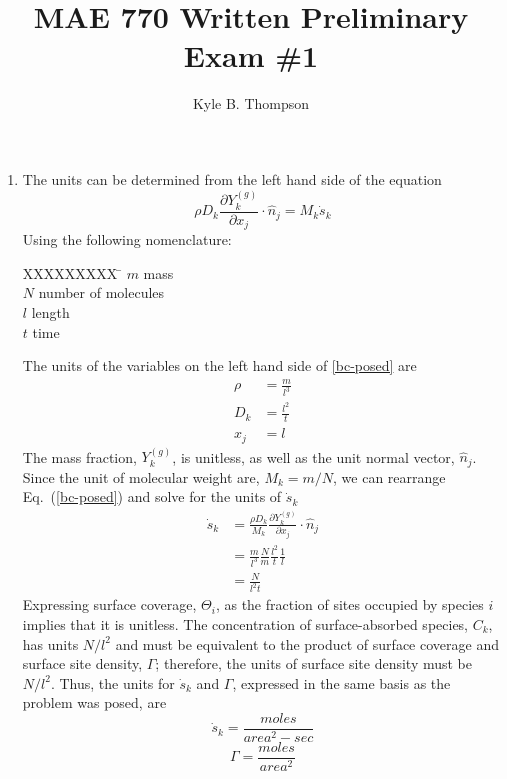 \documentclass{report}
\title{MAE 770 Written Preliminary Exam \#1}
\author{ Kyle B. Thompson }
\newcommand{\eref}[1]{Eq.~(\ref{#1})}
\newcommand{\sk}{\dot{s}_k}
\begin{document}
\maketitle



\begin{enumerate}[label=(\alph*)]
  \item The units can be determined from the left hand side of the equation
    \begin{equation}
      \rho D_k \frac{\partial Y_k^{(g)}}{\partial x_j} \cdot \hat{n}_j = M_k \sk
      \label{bc-posed}
    \end{equation}
  Using the following nomenclature:
  \begin{tabbing}
    XXXXXXXXX \= \kill%
    $m$ \> mass \\
    $N$ \> number of molecules \\
    $l$ \> length \\
    $t$ \> time
  \end{tabbing}
  The units of the variables on the left hand side of \ref{bc-posed} are
  \begin{align*}
    \rho &= \frac{m}{l^3} \\
    D_k &= \frac{l^2}{t} \\
    x_j &= l
  \end{align*}
  The mass fraction, $Y_k^{(g)}$, is unitless, as well as the unit normal vector,
  $\hat{n}_j$. Since the unit of molecular weight are, $M_k = m/N$, we can
  rearrange \eref{bc-posed} and solve for the units of $\sk$
  \begin{equation}
    \label{units sdot}
    \begin{aligned}
      \sk &= \frac{\rho D_k}{M_k}\frac{\partial Y_k^{(g)}}{\partial x_j}\cdot \hat{n}_j \\
      &= \frac{m}{l^3} \frac{N}{m} \frac{l^2}{t}\frac{1}{l} \\
      &= \frac{N}{l^2 t}
    \end{aligned}
  \end{equation}
  Expressing surface coverage, $\Theta_i$, as the fraction of sites occupied by
  species $i$ implies that it is unitless.  The concentration of
  surface-absorbed species, $C_k$, has units $N/l^2$ and must be equivalent to
  the product of surface coverage and surface site density, $\Gamma$; therefore,
  the units of surface site density must be $N/l^2$.  Thus, the units for $\sk$
  and $\Gamma$, expressed in the same basis as the problem was posed, are
  \[
    \boxed{\sk = \frac{moles}{area^2-sec}}
  \]
  \[
    \boxed{\Gamma = \frac{moles}{area^2}}
  \]


\end{enumerate}
\end{document}
